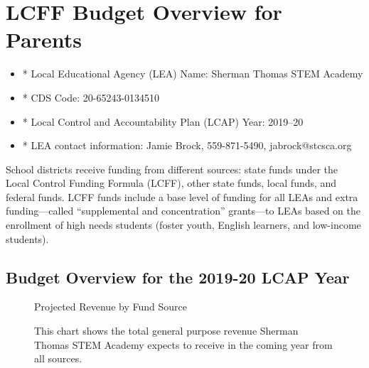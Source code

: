 \documentclass{article}
\newcommand{\pieslicecaption}[3]{{#1, \dollar{#2}, \SI{#3}{\percent}}}
\newcommand{\dollar}[1]{\SI{#1}[\$]{}}
\begin{document}
\section{LCFF Budget Overview for Parents}
\begin{itemize}
\setlength\itemsep{0em}
\item* Local Educational Agency (LEA) Name: Sherman Thomas STEM Academy
\item* CDS Code: 20-65243-0134510
\item* Local Control and Accountability Plan (LCAP) Year: 2019--20
\item* LEA contact information: Jamie Brock, 559-871-5490, jabrock@stcsca.org
\end{itemize}

School districts receive funding from different sources: state funds under the Local Control Funding Formula (LCFF), other state funds, local funds, and federal funds. LCFF funds include a base level of funding for all LEAs and extra funding---called ``supplemental and concentration'' grants---to LEAs based on the enrollment of high needs students (foster youth, English learners, and low-income students).

\subsection{Budget Overview for the 2019-20 LCAP Year}
\begin{figure}[hbtp]
\centering
Projected Revenue by Fund Source
	\caption*{This chart shows the total general purpose revenue Sherman Thomas STEM Academy expects to receive in the coming year from all sources.}
\end{figure}
\end{document}
